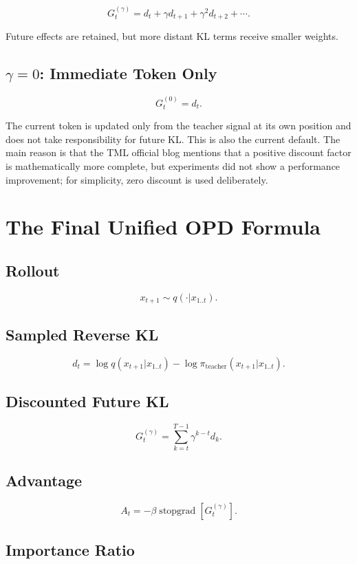 \documentclass[11pt,a4paper]{article}
\begin{document}
\[
G_t^{(\gamma)}
=d_t+\gamma d_{t+1}+\gamma^2d_{t+2}+\cdots.
\]

Future effects are retained, but more distant KL terms receive smaller weights.

\subsection{\texorpdfstring{$\gamma=0$}{gamma=0}: Immediate Token Only}

\[
\boxed{G_t^{(0)}=d_t.}
\]

The current token is updated only from the teacher signal at its own position and does not take responsibility for future KL. This is also the current default. The main reason is that the TML official blog mentions that a positive discount factor is mathematically more complete, but experiments did not show a performance improvement; for simplicity, zero discount is used deliberately.

\section{The Final Unified OPD Formula}

\subsection{Rollout}

\[
x_{t+1}\sim q(\cdot|x_{1..t}).
\]

\subsection{Sampled Reverse KL}

\[
d_t
=
\log q(x_{t+1}|x_{1..t})
-
\log\pi_{\text{teacher}}(x_{t+1}|x_{1..t}).
\]

\subsection{Discounted Future KL}

\[
G_t^{(\gamma)}
=
\sum_{k=t}^{T-1}\gamma^{k-t}d_k.
\]

\subsection{Advantage}

\[
\boxed{
A_t
=
-\beta\operatorname{stopgrad}
\left[G_t^{(\gamma)}\right].
}
\]

\subsection{Importance Ratio}
\end{document}
